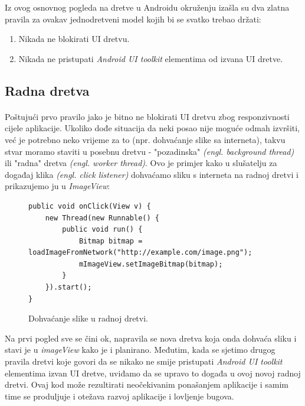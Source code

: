 \documentclass[times, utf8, zavrsni]{fer}
\begin{document}
Iz ovog osnovnog pogleda na dretve u Androidu okruženju izašla su dva zlatna pravila za ovakav jednodretveni model kojih bi se svatko trebao držati:

\begin{enumerate}
\item Nikada ne blokirati UI dretvu.
\item Nikada ne pristupati \textit{Android UI toolkit} elementima od izvana UI dretve.
\end{enumerate}

\subsection{Radna dretva}
\paragraph{}
Poštujući prvo pravilo jako je bitno ne blokirati UI dretvu zbog responzivnosti cijele aplikacije. Ukoliko dođe situacija da neki posao nije moguće odmah izvršiti, već je potrebno neko vrijeme za to (npr. dohvaćanje slike sa interneta), takvu stvar moramo staviti u posebnu dretvu - "pozadinska" \textit{(engl. background thread)}  ili "radna" dretva \textit{(engl. worker thread)}.\newpage
Ovo je primjer kako u slušatelju za događaj klika \textit{(engl. click listener)} dohvaćamo sliku s interneta na radnoj dretvi i prikazujemo ju u \textit{ImageView}:

\begin{figure}[ht!]
\begin{lstlisting}
public void onClick(View v) {
    new Thread(new Runnable() {
        public void run() {
            Bitmap bitmap = loadImageFromNetwork("http://example.com/image.png");
            mImageView.setImageBitmap(bitmap);
        }
    }).start();
}
\end{lstlisting}
\caption{Dohvaćanje slike u radnoj dretvi.}
\label{overflow}
\end{figure}

Na prvi pogled sve se čini ok, napravila se nova dretva koja onda dohvaća sliku i stavi je u \textit{imageView} kako je i planirano. Međutim, kada se sjetimo drugog pravila dretvi koje govori da se nikako ne smije pristupati \textit{Android UI toolkit} elementima izvan UI dretve, uviđamo da se upravo to događa u ovoj novoj radnoj dretvi. Ovaj kod može rezultirati neočekivanim ponašanjem aplikacije i samim time se produljuje i otežava razvoj aplikacije i lovljenje bugova.\\
\end{document}
